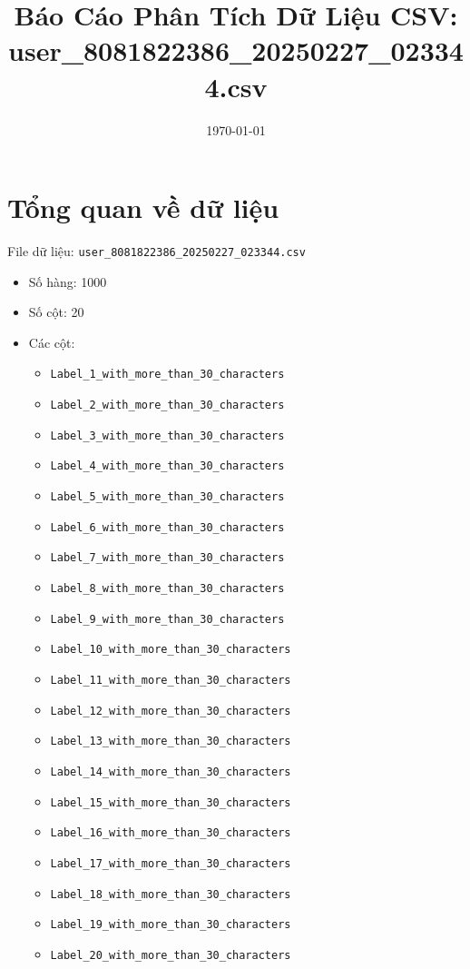 \documentclass[12pt]{article}
\title{Báo Cáo Phân Tích Dữ Liệu CSV: user\_8081822386\_20250227\_023344.csv}
\author{}
\date{\today}
\begin{document}
\maketitle
\thispagestyle{empty}
\newpage

\tableofcontents
\newpage

\section{Tổng quan về dữ liệu}

File dữ liệu: \texttt{user\_8081822386\_20250227\_023344.csv}
\begin{itemize}
    \item Số hàng: 1000
    \item Số cột: 20
    \item Các cột:
    \begin{itemize}
        \item \texttt{Label\_1\_with\_more\_than\_30\_characters}
        \item \texttt{Label\_2\_with\_more\_than\_30\_characters}
        \item \texttt{Label\_3\_with\_more\_than\_30\_characters}
        \item \texttt{Label\_4\_with\_more\_than\_30\_characters}
        \item \texttt{Label\_5\_with\_more\_than\_30\_characters}
        \item \texttt{Label\_6\_with\_more\_than\_30\_characters}
        \item \texttt{Label\_7\_with\_more\_than\_30\_characters}
        \item \texttt{Label\_8\_with\_more\_than\_30\_characters}
        \item \texttt{Label\_9\_with\_more\_than\_30\_characters}
        \item \texttt{Label\_10\_with\_more\_than\_30\_characters}
        \item \texttt{Label\_11\_with\_more\_than\_30\_characters}
        \item \texttt{Label\_12\_with\_more\_than\_30\_characters}
        \item \texttt{Label\_13\_with\_more\_than\_30\_characters}
        \item \texttt{Label\_14\_with\_more\_than\_30\_characters}
        \item \texttt{Label\_15\_with\_more\_than\_30\_characters}
        \item \texttt{Label\_16\_with\_more\_than\_30\_characters}
        \item \texttt{Label\_17\_with\_more\_than\_30\_characters}
        \item \texttt{Label\_18\_with\_more\_than\_30\_characters}
        \item \texttt{Label\_19\_with\_more\_than\_30\_characters}
        \item \texttt{Label\_20\_with\_more\_than\_30\_characters}
    \end{itemize}
\end{itemize}
\end{document}
